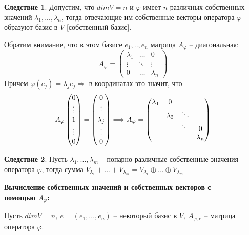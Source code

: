 \documentclass[a4paper, 12pt]{article}
\theoremstyle{definition}
\newtheorem*{consequense}{Следствие}
\begin{document}
    \begin{consequense}
        Допустим, что $dimV = n$ и $\varphi$ имеет $n$
        различных собственных значений $\lambda_1,...,\lambda_n$,
        тогда отвечающие им собственные векторы оператора
        $\varphi$ образуют базис в $V$ [собственный базис].  
    \end{consequense}
    Обратим внимание,  что в этом базисе $e_1,..,e_n$ матрица
    $A_\varphi$ -- диагональная: $$A_\varphi =
    \begin{pmatrix}
        \lambda_1 & \hdots & 0\\\vdots & \ddots & \vdots\\ 0
        & \hdots & \lambda_n
    \end{pmatrix}$$ Причем $\varphi(e_j) = \lambda_je_j
    \Longrightarrow$ в координатах это значит, что
    $$A_\varphi
    \begin{pmatrix} 0\\\vdots\\1\\\vdots\\0 \end{pmatrix} =  
    \begin{pmatrix} 0\\\vdots\\\lambda_j\\\vdots\\0 \end{pmatrix}
    \Longrightarrow A_\varphi = 
    \begin{pmatrix}
        \lambda_1 & 0 & \null & \null\\
        \null & \lambda_2 & \ddots & \null\\
        \null & \null & \ddots & 0\\
        \null & \null & \null & \lambda_n
    \end{pmatrix}$$   

    \begin{consequense}
        Пусть $\lambda_1,...,\lambda_m$ -- попарно различные
        собственные значения оператора $\varphi$, тогда
        сумма $V_{\lambda_1}+...+V_{\lambda_m} =
        V_{\lambda_1}\oplus...\oplus V_{\lambda_m}$  
    \end{consequense}

    \textbf{Вычисление собственных значений и собственных
    векторов с\\ помощью $A_\varphi$:}

    Пусть $dimV = n,\ e = (e_1,...,e_n)$ -- некоторый базис в
    $V,\ A_{\varphi,e}$ -- матрица оператора $\varphi$.
    
\end{document}
